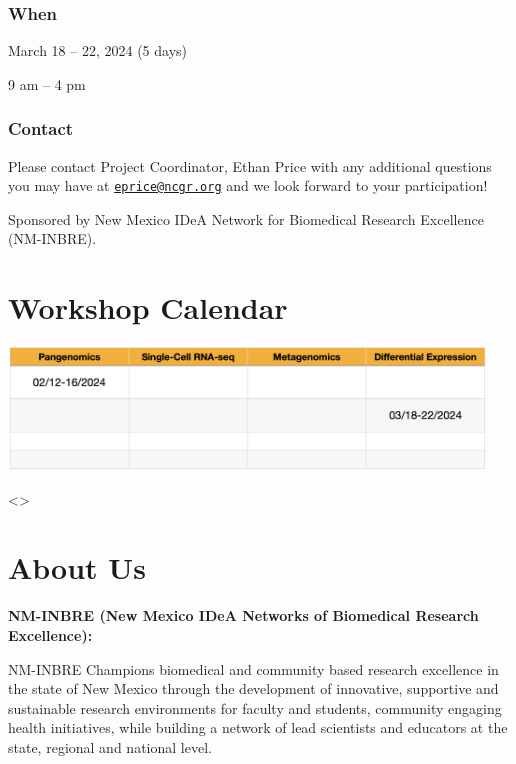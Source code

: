 \documentclass[
]{book}
\begin{document}
\hypertarget{when}{%
\subsection*{When}\label{when}}

March 18 -- 22, 2024 (5 days)

9 am -- 4 pm

\hypertarget{contact}{%
\subsection*{Contact}\label{contact}}

Please contact Project Coordinator, Ethan Price with any additional questions you may have at \href{mailto:eprice@ncgr.org}{\nolinkurl{eprice@ncgr.org}} and we look forward to your participation!

Sponsored by New Mexico IDeA Network for Biomedical Research Excellence (NM-INBRE).

\hypertarget{workshop-calendar}{%
\chapter*{Workshop Calendar}\label{workshop-calendar}}

\includegraphics[width=0.95\textwidth,height=\textheight]{./Figures/WSDates.png}

\textless{}\textgreater{}

\hypertarget{about-us}{%
\chapter*{About Us}\label{about-us}}

\textbf{NM-INBRE (New Mexico IDeA Networks of Biomedical Research Excellence):}

NM-INBRE Champions biomedical and community based research excellence in the state of New Mexico through the development of innovative, supportive and sustainable research environments for faculty and students, community engaging health initiatives, while building a network of lead scientists and educators at the state, regional and national level.
\end{document}
